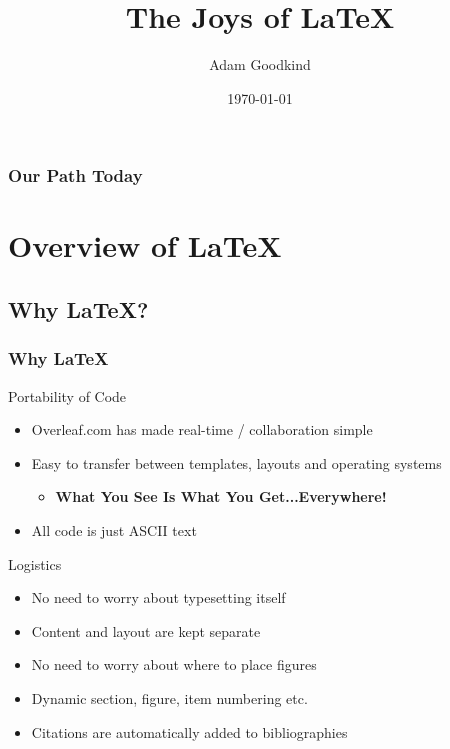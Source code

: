 \documentclass[xcolor={svgnames},
hyperref={colorlinks,citecolor=DeepPink4,linkcolor=DarkRed,urlcolor=DarkBlue}
]{beamer}
\title[Short title]{The Joys of \LaTeX} %
\author{Adam Goodkind} %
\institute[Northwestern University] %
{
	Northwestern University \\ %
	\medskip
	\textit{a.goodkind@u.northwestern.edu} %
}
\date{\today} %
\begin{document}
	
	\begin{frame}
		\titlepage %
	\end{frame}
	
	\begin{frame}
		\frametitle{Our Path Today} %
		\tableofcontents %
	\end{frame}
	
	
	\section{Overview of \LaTeX} %
	\subsection{Why \LaTeX?} 
	\begin{frame}
		\frametitle{Why \LaTeX}
		Portability of Code
		\begin{itemize}
			\item <1-> Overleaf.com has made real-time / collaboration simple
			\item <2-> Easy to transfer between templates, layouts and operating systems
			\begin{itemize}
				\item \textbf{What You See Is What You Get...Everywhere!}
			\end{itemize}
			\item <3-> All code is just ASCII text
		\end{itemize}
		Logistics
		\begin{itemize}
			\item <4-> No need to worry about typesetting itself
			\item <5-> Content and layout are kept separate
			\item <6-> No need to worry about where to place figures
			\item <7-> Dynamic section, figure, item numbering etc.
			\item <8-> Citations are automatically added to bibliographies
		\end{itemize}
	\end{frame}
	
\end{document}
